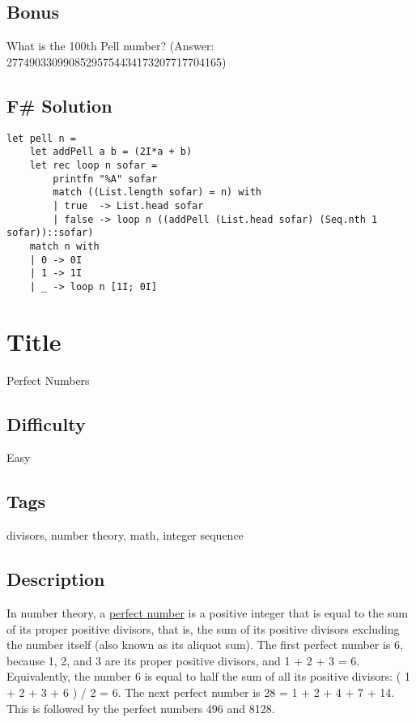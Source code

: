 \subsection{Bonus}\label{bonus-3}

What is the 100th Pell number? (Answer:
27749033099085295754434173207717704165)

\subsection{F\# Solution}\label{f-solution}

\begin{verbatim}
let pell n =
    let addPell a b = (2I*a + b)
    let rec loop n sofar = 
        printfn "%A" sofar
        match ((List.length sofar) = n) with
        | true  -> List.head sofar
        | false -> loop n ((addPell (List.head sofar) (Seq.nth 1 sofar))::sofar)
    match n with
    | 0 -> 0I
    | 1 -> 1I
    | _ -> loop n [1I; 0I]
\end{verbatim}

\section{Title}\label{title-35}

Perfect Numbers

\subsection{Difficulty}\label{difficulty-34}

Easy

\subsection{Tags}\label{tags-35}

divisors, number theory, math, integer sequence

\subsection{Description}\label{description-35}

In number theory, a
\href{http://en.wikipedia.org/wiki/Perfect_number}{perfect number} is a
positive integer that is equal to the sum of its proper positive
divisors, that is, the sum of its positive divisors excluding the number
itself (also known as its aliquot sum). The first perfect number is 6,
because 1, 2, and 3 are its proper positive divisors, and 1 + 2 + 3 = 6.
Equivalently, the number 6 is equal to half the sum of all its positive
divisors: ( 1 + 2 + 3 + 6 ) / 2 = 6. The next perfect number is 28 = 1 +
2 + 4 + 7 + 14. This is followed by the perfect numbers 496 and 8128.

